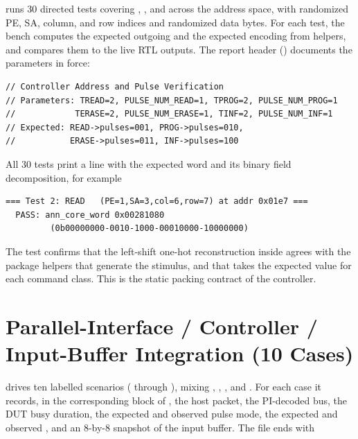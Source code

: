  runs 30 directed tests covering
, , and  across the address
space, with randomized PE, SA, column, and row indices and randomized
data bytes. For each test, the bench computes the expected outgoing
 and the expected  encoding
from  helpers, and compares them to the live RTL
outputs. The report header ()
documents the parameters in force:

\begin{lstlisting}[style=plainstyle,language={}]
// Controller Address and Pulse Verification
// Parameters: TREAD=2, PULSE_NUM_READ=1, TPROG=2, PULSE_NUM_PROG=1
//            TERASE=2, PULSE_NUM_ERASE=1, TINF=2, PULSE_NUM_INF=1
// Expected: READ->pulses=001, PROG->pulses=010,
//           ERASE->pulses=011, INF->pulses=100
\end{lstlisting}

All 30 tests print a  line with the expected word and its
binary field decomposition, for example

\begin{lstlisting}[style=plainstyle,language={}]
=== Test 2: READ   (PE=1,SA=3,col=6,row=7) at addr 0x01e7 ===
  PASS: ann_core_word 0x00281080
         (0b00000000-0010-1000-00010000-10000000)
\end{lstlisting}

\noindent The test confirms that the left-shift one-hot reconstruction
inside  agrees with the package helpers that
generate the stimulus, and that  takes the expected
 value for each command class. This is the static
packing contract of the controller.

\section{Parallel-Interface / Controller / Input-Buffer Integration (10 Cases)}
\label{sec:results-integration}

 drives ten
labelled scenarios ( through ), mixing
, , , and . For
each case it records, in the corresponding block of
, the host packet, the
PI-decoded bus, the DUT busy duration, the expected and observed pulse
mode, the expected and observed , and an 8-by-8
snapshot of the input buffer. The file ends with

